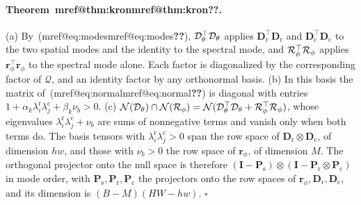 \documentclass[10pt,twocolumn,letterpaper]{article}
\makeatletter
\newcommand{\mref}[1]{\ifcsname mref@#1\endcsname\csname mref@#1\endcsname\else\textbf{??}\fi}
\makeatother
\begin{document}
\paragraph{Theorem~\mref{thm:kron}.} (a) By~(\mref{eq:modes}), $\mathcal{D}_\theta^{\top}\mathcal{D}_\theta$ applies $\mathbf{D}_{\mathrm{r}}^{\top}\mathbf{D}_{\mathrm{r}}$ and $\mathbf{D}_{\mathrm{c}}^{\top}\mathbf{D}_{\mathrm{c}}$ to the two spatial modes and the identity to the spectral mode, and $\mathcal{R}_\phi^{\top}\mathcal{R}_\phi$ applies $\mathbf{r}_\phi^{\top}\mathbf{r}_\phi$ to the spectral mode alone. Each factor is diagonalized by the corresponding factor of $\mathcal{Q}$, and an identity factor by any orthonormal basis. (b) In this basis the matrix of~(\mref{eq:normal}) is diagonal with entries $1+\alpha_k\lambda^{\mathrm{r}}_i\lambda^{\mathrm{c}}_j+\beta_k\nu_b>0$. (c) $\mathcal{N}(\mathcal{D}_\theta)\cap\mathcal{N}(\mathcal{R}_\phi)=\mathcal{N}(\mathcal{D}_\theta^{\top}\mathcal{D}_\theta+\mathcal{R}_\phi^{\top}\mathcal{R}_\phi)$, whose eigenvalues $\lambda^{\mathrm{r}}_i\lambda^{\mathrm{c}}_j+\nu_b$ are sums of nonnegative terms and vanish only when both terms do. The basis tensors with $\lambda^{\mathrm{r}}_i\lambda^{\mathrm{c}}_j>0$ span the row space of $\mathbf{D}_{\mathrm{r}}\otimes\mathbf{D}_{\mathrm{c}}$, of dimension $hw$, and those with $\nu_b>0$ the row space of $\mathbf{r}_\phi$, of dimension $M$. The orthogonal projector onto the null space is therefore $(\mathbf{I}-\mathbf{P}_{\mathrm{s}})\otimes(\mathbf{I}-\mathbf{P}_{\mathrm{r}}\otimes\mathbf{P}_{\mathrm{c}})$ in mode order, with $\mathbf{P}_{\mathrm{s}},\mathbf{P}_{\mathrm{r}},\mathbf{P}_{\mathrm{c}}$ the projectors onto the row spaces of $\mathbf{r}_\phi,\mathbf{D}_{\mathrm{r}},\mathbf{D}_{\mathrm{c}}$, and its dimension is $(B-M)(HW-hw)$. \hfill$\square$
\end{document}

